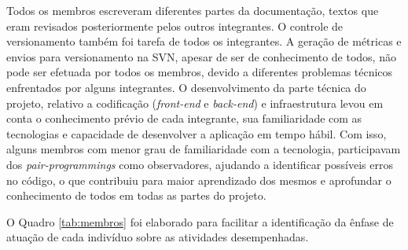\documentclass[
    12pt,               %
    openright,          %
    oneside,
    a4paper,            %
    BIBLATEX,           %
    TODO,               %
    english,            %
    brazil              %
    ]{ifsp-spo-inf-ctds}
\begin{document}
            Todos os membros escreveram diferentes partes da documentação, textos que eram revisados posteriormente pelos outros integrantes. O controle de versionamento também foi tarefa de todos os integrantes. A geração de métricas e envios para versionamento na SVN, apesar de ser de conhecimento de todos, não pode ser efetuada por todos os membros, devido a diferentes problemas técnicos enfrentados por alguns integrantes.
            O desenvolvimento da parte técnica do projeto, relativo a codificação (\emph{front-end} e \emph{back-end}) e infraestrutura levou em conta o conhecimento prévio de cada integrante, sua familiaridade com as tecnologias e capacidade de desenvolver a aplicação em tempo hábil. Com isso, alguns membros com menor grau de familiaridade com a tecnologia, participavam dos \emph{pair-programmings} como observadores, ajudando a identificar possíveis erros no código, o que contribuiu para maior aprendizado dos mesmos e aprofundar o conhecimento de todos em todas as partes do projeto.
            
             O Quadro \ref{tab:membros} foi elaborado para facilitar a identificação da ênfase de atuação de cada indivíduo sobre as atividades desempenhadas.
\end{document}
